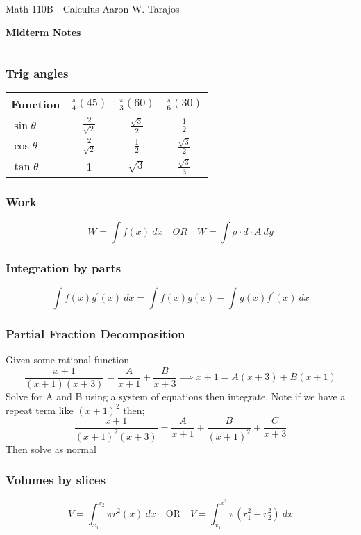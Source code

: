 \documentclass{article}
\begin{document}
\noindent
Math 110B - Calculus \hfill Aaron W. Tarajos
\begin{center}
	\textbf{Midterm Notes}
\end{center}

\noindent\rule{\textwidth}{0.4pt}

\begin{multicols}{2}

\subsubsection*{Trig angles}
    \begin{tabular}{|l|c|c|c|}
        \hline
	Function & $\frac{\pi}{4}(45)$ & $\frac{\pi}{3}(60)$ & $\frac{\pi}{6}(30)$\\
        \hline
	$\sin \theta$ & $\frac{2}{\sqrt2}$ & $\frac{\sqrt 3}{2}$ & $\frac{1}{2}$\\
	$\cos \theta$ & $\frac{2}{\sqrt2}$ & $\frac{1}{2}$ & $\frac{\sqrt{3}}{2}$ \\
	$\tan \theta$ & 1 & $\sqrt{3}$ & $\frac{\sqrt{3}}{3}$ \\
	\hline
    \end{tabular}

\subsubsection*{Work}
\[
	W = \int f(x)\ dx \quad OR \quad W = \int \rho \cdot d \cdot A \ dy
\]

\subsubsection*{Integration by parts}
\[
	\int f(x)g^\prime(x)\ dx = \int f(x)g(x) - \int g(x)f^\prime(x)\ dx
\]

\subsubsection*{Partial Fraction Decomposition}
Given some rational function
\[
	\frac{x+1}{(x+1)(x+3)} = \frac{A}{x+1} + \frac{B}{x+3} \implies x+1 = A(x+3) + B(x+1)
\]
Solve for A and B using a system of equations then integrate. Note if we have a repeat term like $(x+1)^2$ then;
\[
	\frac{x+1}{(x+1)^2(x+3)} = \frac{A}{x+1} + \frac{B}{(x+1)^2} + \frac{C}{x+3}
\]
Then solve as normal

\subsubsection*{Volumes by slices}
\[
	V = \int_{x_1}^{x_2} \pi r^2(x)\ dx \quad \text{OR} \quad V = \int_{x_1}^{x^2} \pi \left(r_1^2 - r_2^2 \right)\ dx
\]


\end{multicols}
\end{document}
